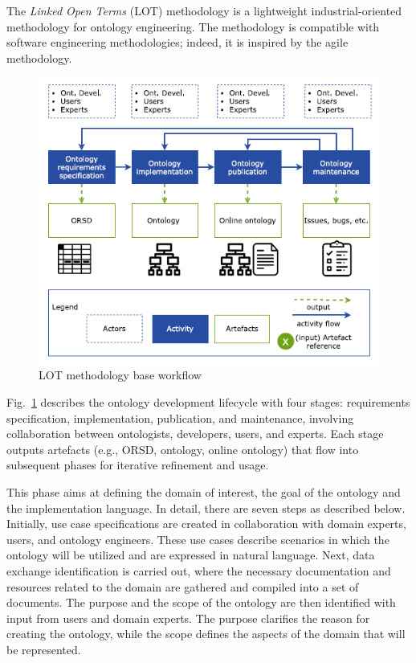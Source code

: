 The \textit{Linked Open Terms} (LOT) methodology \cite{poveda2022lot} is a lightweight industrial-oriented methodology for ontology engineering.
The methodology is compatible with software engineering methodologies; indeed, it is inspired by the agile methodology.
\begin{figure}[H]
    \centering
    \includegraphics[width=0.7\linewidth]{Figures/fig_3.png}
    \caption{LOT methodology base workflow}
    \label{fig:lot-workflow}
\end{figure}

Fig.~\ref{fig:lot-workflow} describes the ontology development lifecycle with four stages: requirements specification, implementation, publication, and maintenance, involving collaboration between ontologists, developers, users, and experts.
Each stage outputs artefacts (e.g., ORSD, ontology, online ontology) that flow into subsequent phases for iterative refinement and usage.

This phase aims at defining the domain of interest, the goal of the ontology and the implementation language.
In detail, there are seven steps as described below.
Initially, use case specifications are created in collaboration with domain experts, users, and ontology engineers.
These use cases describe scenarios in which the ontology will be utilized and are expressed in natural language.
Next, data exchange identification is carried out, where the necessary documentation and resources related to the domain are gathered and compiled into a set of documents.
The purpose and the scope of the ontology are then identified with input from users and domain experts.
The purpose clarifies the reason for creating the ontology, while the scope defines the aspects of the domain that will be represented.


